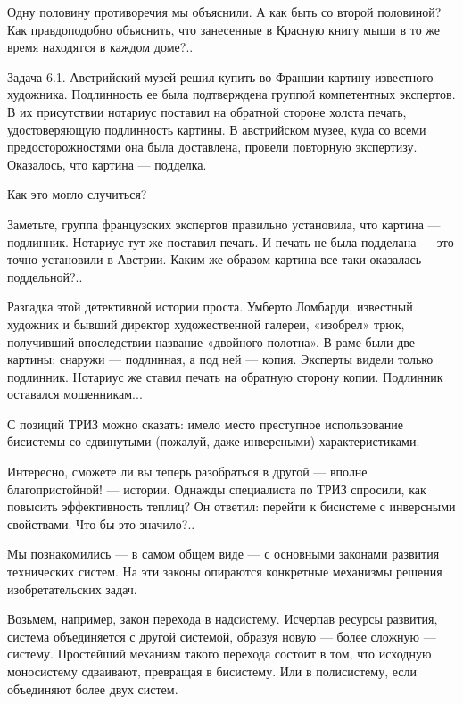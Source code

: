 Одну  половину  противоречия  мы  объяснили.  А  как  быть  со  второй
половиной? Как правдоподобно объяснить, что занесенные в Красную книгу
мыши в то же время находятся в каждом доме?..




Задача  6.1.  Австрийский  музей   решил  купить  во  Франции  картину
известного  художника.   Подлинность  ее  была   подтверждена  группой
компетентных  экспертов.   В  их  присутствии  нотариус   поставил  на
обратной  стороне холста  печать, удостоверяющую  подлинность картины.
В  австрийском  музее,  куда  со  всеми  предосторожностями  она  была
доставлена,  провели повторную  экспертизу. Оказалось,  что картина  —
подделка.

Как это могло случиться?


Заметьте,  группа  французских  экспертов  правильно  установила,  что
картина — подлинник. Нотариус тут же поставил печать. И печать не была
подделана — это  точно установили в Австрии. Каким  же образом картина
все-таки оказалась поддельной?..

Разгадка этой детективной истории  проста. Умберто Ломбарди, известный
художник  и бывший  директор художественной  галереи, «изобрел»  трюк,
получивший впоследствии  название «двойного полотна». В  раме были две
картины:  снаружи —  подлинная, а  под  ней —  копия. Эксперты  видели
только подлинник. Нотариус же ставил печать на обратную сторону копии.
Подлинник оставался мошенникам...

С  позиций ТРИЗ  можно сказать:  имело место  преступное использование
бисистемы со сдвинутыми (пожалуй, даже инверсными) характеристиками.

Интересно,  сможете  ли  вы  теперь  разобраться  в  другой  —  вполне
благопристойной! — истории. Однажды  специалиста по ТРИЗ спросили, как
повысить  эффективность  теплиц? Он  ответил:  перейти  к бисистеме  с
инверсными свойствами. Что бы это значило?..



Мы познакомились — в самом общем  виде — с основными законами развития
технических  систем.  На  эти законы  опираются  конкретные  механизмы
решения изобретательских задач.

Возьмем,  например,  закон  перехода в  надсистему.  Исчерпав  ресурсы
развития,  система объединяется  с  другой системой,  образуя новую  —
более сложную — систему. Простейший механизм такого перехода состоит в
том, что исходную моносистему сдваивают,  превращая в бисистему. Или в
полисистему, если объединяют более двух систем.

